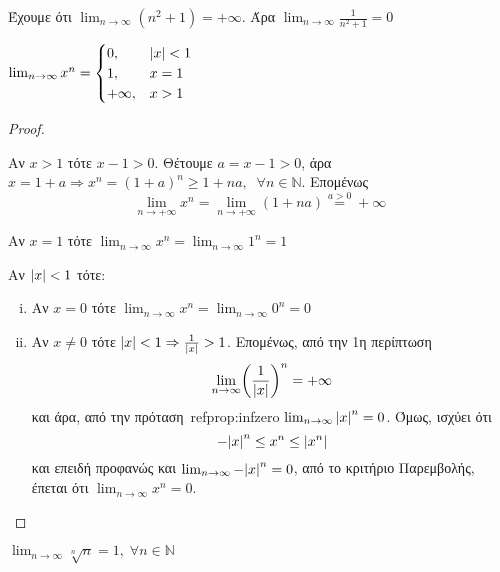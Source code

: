 \begin{example}
  Έχουμε ότι $ \lim_{n \to \infty} (n^{2}+1) = +\infty $. Άρα 
  $ \lim_{n \to \infty} \frac{1}{n^{2}+1} = 0 $
\end{example}

\begin{mybox3}
  \begin{prop}
    $ \lim_{n \to \infty} x^{n} = 
    \begin{cases} 
      0, & \abs{x} < 1 \\
      1, & x=1 \\
      +\infty, & x > 1
    \end{cases} $ 
  \end{prop}
\end{mybox3}
\begin{proof}
\item {}
  \begin{myitemize}
    \item Αν $ x>1 $ τότε $ x-1>0 $. Θέτουμε $ a = x-1>0 $, άρα $ x = 1+a 
      \Rightarrow x^{n} = (1+a)^{n} \geq 1+na, \; \; \forall n \in \mathbb{N} $.
      Επομένως 
      \[
        \lim_{n \to +\infty} x^{n} = \lim_{n \to +\infty} (1+na) 
        \overset{a>0}{=} +\infty 
      \]
    \item Αν $ x=1 $ τότε $ \lim_{n \to \infty} x^{n} = \lim_{n \to \infty} 1^{n} = 1 $
    \item Αν $ \abs{x} < 1 $ τότε: 
      \begin{enumerate}[i)]
        \item Αν $ x=0 $ τότε $ \lim_{n \to \infty} x^{n} = 
          \lim_{n \to \infty} 0^{n} = 0 $
        \item Αν $ x \neq 0 $ τότε $ \abs{x} < 1 \Rightarrow \frac{1}{\abs{x}} > 1$. 
          Επομένως, από την 1η περίπτωση
          \[
            \lim_{n \to \infty} \biggl(\frac{1}{\abs{x}}\biggr)^{n} = + \infty
          \] 
          και άρα, από την πρόταση~ref{prop:infzero} 
          $ \lim_{n \to \infty} \abs{x} ^{n} = 0 $. Όμως, ισχύει ότι
          \[
            - \abs{x} ^{n} \leq x^{n} \leq \abs{x^{n}}
          \]
          και επειδή προφανώς και $ \lim_{n \to \infty} - \abs{x} ^{n} = 0 $, από 
          το κριτήριο Παρεμβολής, έπεται ότι $ \lim_{n \to \infty} x^{n} = 0 $.
      \end{enumerate}
  \end{myitemize}
\end{proof}


\begin{mybox3}
  \begin{prop}
    $ \lim_{n \to \infty} \sqrt[n]{n} = 1, \; \forall n \in \mathbb{N}  $
  \end{prop}
\end{mybox3}

